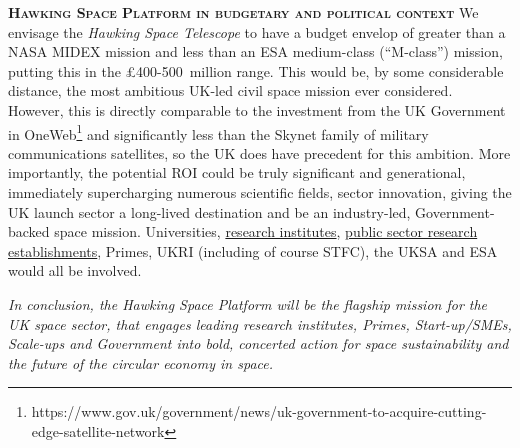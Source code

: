 \documentclass[a4paper,12pt]{article}
\begin{document}

\smallskip \smallskip
\noindent
{\bfseries \textsc{\textcolor{Cerulean}{Hawking Space Platform in budgetary and political context}}}
  We envisage the \textit{Hawking Space Telescope} to have a budget envelop of
greater than a NASA MIDEX mission and less than an ESA medium-class
(``M-class'') mission, putting this in the \pounds400-500~million range.
This would be, by some considerable distance, the most ambitious UK-led
civil space mission ever considered. However, this is directly comparable to
the investment from the UK Government in
OneWeb\footnote{https://www.gov.uk/government/news/uk-government-to-acquire-cutting-edge-satellite-network}
and significantly less than the Skynet family of military
communications satellites, so the UK does have precedent for this
ambition.  More importantly, the potential ROI could be truly significant and generational,  
immediately supercharging numerous scientific fields, sector innovation, giving the
UK launch sector a long-lived destination and be an industry-led, 
Government-backed space mission.  Universities,
\href{https://www.ukri.org/apply-for-funding/how-to-apply/check-if-you-are-eligible-for-research-and-innovation-funding/eligible-research-institutes/}{research
institutes},
\href{https://www.ukri.org/apply-for-funding/how-to-apply/check-if-you-are-eligible-for-research-and-innovation-funding/eligible-public-sector-research-establishments/#contents-list}{public
sector research establishments}, Primes, UKRI (including of course STFC), the
UKSA and ESA would all be involved.

\smallskip \smallskip
\noindent
\textit{In conclusion, the \textit{Hawking Space Platform} will be the
flagship mission for the UK space sector, that engages leading
research institutes, Primes, Start-up/SMEs, Scale-ups and Government
into bold, concerted action for space sustainability and the future of
the circular economy in space.}
  \vspace{-18pt}

\end{document}
